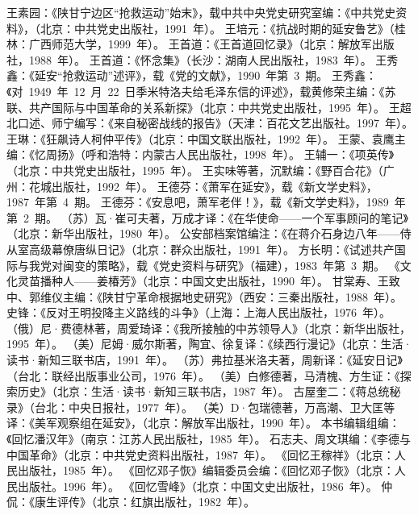 \begin{thebibliography}{999}
\bibitem{}王素园：《陕甘宁边区“抢救运动”始末》，载中共中央党史研究室编：《中共党史资料》，（北京：中共党史出版社，1991~年）。
\bibitem{}王培元：《抗战时期的延安鲁艺》（桂林：广西师范大学，1999~年）。
\bibitem{}王首道：《王首道回忆录》（北京：解放军出版社，1988~年）。
\bibitem{}王首道：《怀念集》（长沙：湖南人民出版社，1983~年）。
\bibitem{}王秀鑫：《延安“抢救运动”述评》，载《党的文献》，1990~年第~3~期。
\bibitem{}王秀鑫：《对~1949~年~12~月~22~日季米特洛夫给毛泽东信的评述》，载黄修荣主编：《苏联、共产国际与中国革命的关系新探》（北京：中共党史出版社，1995~年）。
\bibitem{}王超北口述、师宁编写：《来自秘密战线的报告》（天津：百花文艺出版社。1997~年）。
\bibitem{}王琳：《狂飙诗人柯仲平传》（北京：中国文联出版社，1992~年）。
\bibitem{}王蒙、袁鹰主编：《忆周扬》（呼和浩特：内蒙古人民出版社，1998~年）。
\bibitem{}王辅一：《项英传》（北京：中共党史出版社，1995~年）。
\bibitem{}王实味等著，沉默编：《野百合花》（广州：花城出版社，1992~年）。
\bibitem{}王德芬：《萧军在延安》，载《新文学史料》，1987~年第~4~期。
\bibitem{}王德芬：《安息吧，萧军老伴！》，载《新文学史料》，1989~年第~2~期。
\bibitem{}（苏）瓦·崔可夫著，万成才译：《在华使命——一个军事顾问的笔记》（北京：新华出版社，1980~年）。
\bibitem{}公安部档案馆编注：《在蒋介石身边八年——侍从室高级幕僚唐纵日记》（北京：群众出版社，1991~年）。
\bibitem{}方长明：《试述共产国际与我党对闽变的策略》，载《党史资料与研究》（福建），1983~年第~3~期。
\bibitem{}《文化灵苗播种人——姜椿芳》（北京：中国文史出版社，1990~年）。
\bibitem{}甘棠寿、王致中、郭维仪主编：《陕甘宁革命根据地史研究》（西安：三秦出版社，1988~年）。
\bibitem{}史锋：《反对王明投降主义路线的斗争》（上海：上海人民出版社，1976~年）。
\bibitem{}（俄）尼·费德林著，周爱琦译：《我所接触的中苏领导人》（北京：新华出版社，1995~年）。
\bibitem{}（美）尼姆·威尔斯著，陶宜、徐复译：《续西行漫记》（北京：生活·读书·新知三联书店，1991~年）。
\bibitem{}（苏）弗拉基米洛夫著，周新译：《延安日记》（台北：联经出版事业公司，1976~年）。
\bibitem{}（美）白修德著，马清槐、方生证：《探索历史》（北京：生活·读书·新知三联书店，1987~年）。
\bibitem{}古屋奎二：《蒋总统秘录》（台北：中央日报社，1977~年）。
\bibitem{}（美）D·包瑞德著，万高潮、卫大匡等译：《美军观察组在延安》，（北京：解放军出版社，1990~年）。
\bibitem{}本书编辑组编：《回忆潘汉年》（南京：江苏人民出版社，1985~年）。
\bibitem{}石志夫、周文琪编：《李德与中国革命》（北京：中共党史资料出版社，1987~年）。
\bibitem{}《回忆王稼祥》（北京：人民出版社，1985~年）。
\bibitem{}《回忆邓子恢》编辑委员会编：《回忆邓子恢》（北京：人民出版社。1996~年）。
\bibitem{}《回忆雪峰》（北京：中国文史出版社，1986~年）。
\bibitem{}仲侃：《康生评传》（北京：红旗出版社，1982~年）。

\end{thebibliography}
